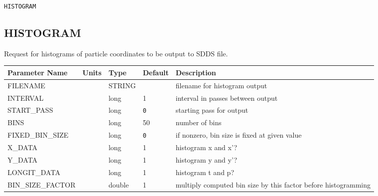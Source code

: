 \vspace*{0.5in}

\begin{latexonly}
\newpage
\begin{center}{\Large\verb|HISTOGRAM|}\end{center}
\end{latexonly}\subsection{HISTOGRAM}
Request for histograms of particle coordinates to be output to SDDS file.
\\
\begin{tabular}{|l|l|l|l|p{\descwidth}|} \hline
Parameter Name & Units & Type & Default & Description \\ \hline 
FILENAME &  & STRING &                   & filename for histogram output  \\ \hline 
INTERVAL &  & long &   1               & interval in passes between output  \\ \hline 
START\_PASS &  & long &  \verb|0| & starting pass for output  \\ \hline 
BINS &  & long &   50              & number of bins  \\ \hline 
FIXED\_BIN\_SIZE &  & long &  \verb|0| & if nonzero, bin size is fixed at given value  \\ \hline 
X\_DATA &  & long &   1               & histogram x and x'?  \\ \hline 
Y\_DATA &  & long &   1               & histogram y and y'?  \\ \hline 
LONGIT\_DATA &  & long &   1               & histogram t and p?  \\ \hline 
BIN\_SIZE\_FACTOR &  & double &   1 & multiply computed bin size by this factor before histogramming  \\ \hline 
\end{tabular}

